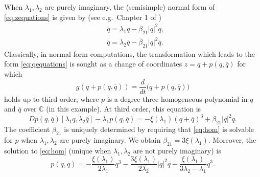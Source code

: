 \documentclass[a4paper, 12pt, oneside, reqno, notitlepage]{amsart}
\theoremstyle{plain}
\theoremstyle{definition}
\theoremstyle{remark}
\begin{document}
When $\lambda_1,\lambda_2$ are purely imaginary,
the (semisimple) normal form of \eqref{eq:zequations} is given by (see e.g.\ Chapter 1 of \cite{murdock2003normal})
\begin{subequations}\label{eq:qequations}
\begin{align}
    &\dot{q} = \lambda_1 q - \beta_{21} |q|^2 q, \\
    &\dot{\overline{q}} = \lambda_2 \overline{q}  - \overline{\beta}_{21} |q|^2 \overline{q}.
\end{align} 
\end{subequations}
Classically, in normal form computations, the transformation which leads to the form \eqref{eq:qequations} is  sought as a change of coordinates $z = q + p(q,\overline{q})$ for which
\begin{displaymath}
    g(q + p(q,\overline{q})) = \frac{d}{dt} \big(q + p(q,\overline{q}) \big)
\end{displaymath}
holds up to third order; where $p$ is a degree three homogeneous polynomial in $q$ and $\overline{q}$ over $\mathbb{C}$ (in this example).
At third order, this equation is
\begin{equation}
    Dp (q,\overline{q})[\lambda_1 q,\lambda_2 \overline{q}] - \lambda_1 p(q,\overline{q}) = -\xi(\lambda_1) (q + \overline{q})^3 +\beta_{21} |q|^2 q.
    \label{eq:hom}
\end{equation}
The coefficient $\beta_{21}$ is uniquely determined by requiring that \eqref{eq:hom}
is solvable for $p$ when $\lambda_1,\lambda_2$ are purely imaginary.
We obtain  $\beta_{21} = 3 \xi(\lambda_1)$.
Moreover, the solution to \eqref{eq:hom} (unique when $\lambda_1,\lambda_2$ are not purely imaginary) is 
\begin{displaymath}
    p(q,\overline{q}) = -\frac{\xi(\lambda_1)}{2 \lambda_1} q^3 - \frac{3 \xi (\lambda_1)}{2 \lambda_2} |q|^2 \overline{q} - \frac{\xi(\lambda_1)}{3 \lambda_2-\lambda_1} \overline{q}^3.
\end{displaymath}
\end{document}
